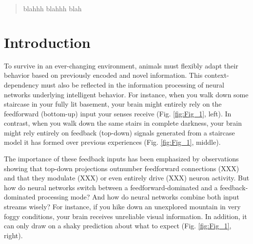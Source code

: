 \documentclass[10pt,a4paper,draft]{article}
\begin{document}
\thispagestyle{empty}

\begin{flushleft}
{\Large
\textbf{}
}

\end{flushleft}


\begin{abstract}
blahhh blahhh blah
\end{abstract}

\section*{Introduction}
%
To survive in an ever-changing environment, animals must flexibly adapt their behavior based on previously encoded and novel information. This context-dependency must also be reflected in the information processing of neural networks underlying intelligent behavior. For instance, when you walk down some staircase in your fully lit basement, your brain might entirely rely on the feedforward (bottom-up) input your senses receive (Fig. \ref{fig:Fig_1}, left). In contrast, when you walk down the same stairs in complete darkness, your brain might rely entirely on feedback (top-down) signals generated from a staircase model it has formed over previous experiences (Fig. \ref{fig:Fig_1}, middle). 

The importance of these feedback inputs has been emphasized by observations showing that top-down projections outnumber feedforward connections (XXX) and that they modulate (XXX) or even entirely drive (XXX) neuron activity. But how do neural networks switch between a feedforward-dominated and a feedback-dominated processing mode? And how do neural networks combine both input streams wisely? For instance, if you hike down an unexplored mountain in very foggy conditions, your brain receives unreliable visual information. In addition, it can only draw on a shaky prediction about what to expect (Fig. \ref{fig:Fig_1}, right). 
\end{document}

